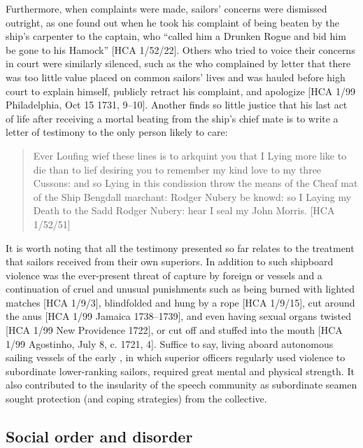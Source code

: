 \largerpage
Furthermore, when complaints were made, sailors’ concerns were dismissed outright, as one  found out when he took his complaint of being beaten by the ship’s carpenter to the captain, who “called him a Drunken Rogue and bid him be gone to his Hamock” [HCA 1/52/22]. Others who tried to voice their concerns in court were similarly silenced, such as the  who complained by letter that there was too little value placed on common sailors’ lives and was hauled before high court to explain himself, publicly retract his complaint, and apologize [HCA 1/99 Philadelphia, Oct 15 1731, 9–10]. Another  finds so little justice that his last act of life after receiving a mortal beating from the ship’s chief mate is to write a letter of testimony to the only person likely to care:

\largerpage
\begin{quotation}
Ever Loufing wief these lines is to arkquint you that I Lying more like to die than to lief desiring you to remember my kind love to my three Cussons: and so Lying in this condission throw the means of the Cheaf mat of the Ship Bengdall marchant: Rodger Nubery be knowd: so I Laying my Death to the Sadd Rodger Nubery: hear I seal my John Morris. [HCA 1/52/51] \end{quotation}

It is worth noting that all the testimony presented so far relates to the treatment that sailors received from their own superiors. In addition to such shipboard violence was the ever-present threat of capture by foreign or  vessels and a continuation of cruel and unusual punishments such as being burned with lighted matches [HCA 1/9/3], blindfolded and hung by a rope [HCA 1/9/15], cut around the anus [HCA 1/99 Jamaica {1738}–1739], and even having sexual organs twisted [HCA 1/99 New  Providence 1722], or cut off and stuffed into the mouth [HCA 1/99 Agostinho, July 8, c. 1721, 4]. Suffice to say, living aboard autonomous sailing vessels of the early , in which superior officers regularly used violence to subordinate lower-ranking sailors, required great mental and physical strength. It also contributed to the insularity of the speech community as subordinate seamen sought protection (and coping strategies) from the collective.

\subsection{{Social order and disorder}}\label{sec:4.2.3}
\largerpage

